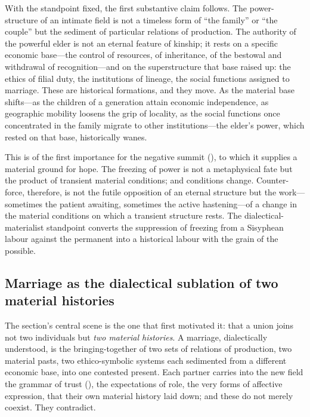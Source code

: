With the standpoint fixed, the first substantive claim follows. The power-structure of an intimate field is not a timeless form of ``the family'' or ``the couple'' but the sediment of particular relations of production. The authority of the powerful elder is not an eternal feature of kinship; it rests on a specific economic base---the control of resources, of inheritance, of the bestowal and withdrawal of recognition---and on the superstructure that base raised up: the ethics of filial duty, the institutions of lineage, the social functions assigned to marriage. These are historical formations, and they move. As the material base shifts---as the children of a generation attain economic independence, as geographic mobility loosens the grip of locality, as the social functions once concentrated in the family migrate to other institutions---the elder's power, which rested on that base, historically wanes.

This is of the first importance for the negative summit (), to which it supplies a material ground for hope. The freezing of power is not a metaphysical fate but the product of transient material conditions; and conditions change. Counter-force, therefore, is not the futile opposition of an eternal structure but the work---sometimes the patient awaiting, sometimes the active hastening---of a change in the material conditions on which a transient structure rests. The dialectical-materialist standpoint converts the suppression of freezing from a Sisyphean labour against the permanent into a historical labour with the grain of the possible.

\subsection{Marriage as the dialectical sublation of two material histories}
\label{p17:sub:histmat-sublation}

The section's central scene is the one that first motivated it: that a union joins not two individuals but \emph{two material histories}. A marriage, dialectically understood, is the bringing-together of two sets of relations of production, two material pasts, two ethico-symbolic systems each sedimented from a different economic base, into one contested present. Each partner carries into the new field the grammar of trust (), the expectations of role, the very forms of affective expression, that their own material history laid down; and these do not merely coexist. They contradict.


